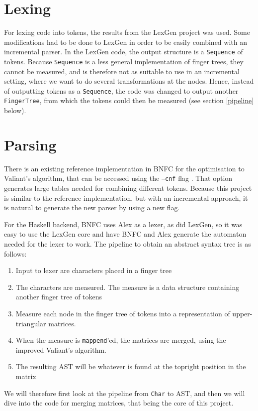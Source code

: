 \documentclass[a4paper,12pt,notitlepage]{report}
\renewcommand\cite{\citep}
\begin{document}
\section{Lexing}
For lexing code into tokens, the results from the LexGen project was used. Some
modifications had to be done to LexGen in order to be easily combined with an
incremental parser. In the LexGen code, the output structure is a
\texttt{Sequence} of tokens. Because \texttt{Sequence} is a less general
implementation of finger trees, they cannot be measured, and is therefore not as
suitable to use in an incremental setting, where we want to do several
transformations at the nodes. Hence, instead of outputting tokens as a
\texttt{Sequence}, the code was changed to output another \texttt{FingerTree},
from which the tokens could then be measured (see section \ref{pipeline} below).

\section{Parsing}
There is an existing reference implementation in BNFC for the optimisation to
Valiant's algorithm, that can be accessed using the \texttt{---cnf} flag
\cite{parparsepaper}. That option generates large tables needed for combining
different tokens. Because this project is similar to the reference
implementation, but with an incremental approach, it is natural to generate the
new parser by using a new flag.

For the Haskell backend, BNFC uses Alex as a lexer, as did LexGen, so it was
easy to use the LexGen core and have BNFC and Alex generate the automaton needed
for the lexer to work. The pipeline to obtain an abstract syntax tree is as
follows:

\begin{enumerate}
    \item Input to lexer are characters placed in a finger tree
    \item The characters are measured. The measure is a data structure containing
          another finger tree of tokens
    \item Measure each node in the finger tree of tokens into a representation
          of upper-triangular matrices.
    \item When the measure is \texttt{mappend}'ed, the matrices are merged,
          using the improved Valiant's algorithm.
    \item The resulting AST will be whatever is found at the topright position
          in the matrix
\end{enumerate}
We will therefore first look at the pipeline from \texttt{Char} to AST, and then
we will dive into the code for merging matrices, that being the core of this
project. 
\end{document}
